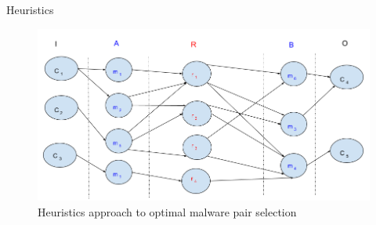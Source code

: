 \documentclass[]{beamer}
\begin{document}
\begin{frame}[plain]{Heuristics}
\begin{figure}[H]
  \centering
  \includegraphics[scale=0.3]{figures/dhkheuristics.png}
  \caption[]{Heuristics approach to optimal malware pair selection}\label{fig:dhkheuristics}
  \centering
\end{figure}
\end{frame}
\end{document}
